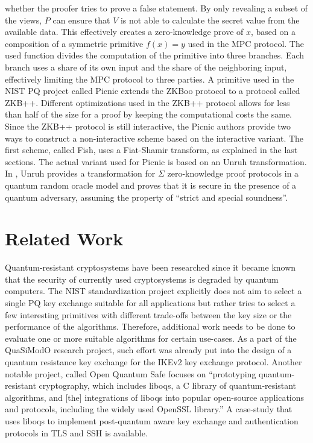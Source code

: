 whether the proofer tries to prove a false statement. By only revealing a subset of the views, \(P\) can ensure that \(V\) is not able to calculate the secret value from the available data. This effectively creates a zero-knowledge prove of \(x\), based on a composition of a symmetric primitive \(f(x) = y \) used in the \ac{MPC} protocol. The used function divides the computation of the primitive into three branches. Each branch uses a share of its own input and the share of the neighboring input, effectively limiting the \ac{MPC} protocol to three parties\cite{giacomelli2016zkboo}. A primitive used in the \ac{NIST} \ac{PQ} project called Picnic extends the ZKBoo protocol to a protocol called ZKB++. Different optimizations used in the ZKB++ protocol allows for less than half of the size for a proof by keeping the computational costs the same\cite{cryptoeprint:2017:279}. Since the ZKB++ protocol is still interactive, the Picnic authors provide two ways to construct a non-interactive scheme based on the interactive variant. The first scheme, called Fish, uses a Fiat-Shamir transform, as explained in the last sections. The actual variant used for Picnic is based on an Unruh transformation. In \cite{unruh2012quantum}, Unruh provides a transformation for \(\Sigma\) zero-knowledge proof protocols in a quantum random oracle model and proves that it is secure in the presence of a quantum adversary, assuming the property of ``strict and special soundness''.


\section{Related Work}

Quantum-resistant cryptosystems have been researched since it became known that the security of currently used cryptosystems is degraded by quantum computers. The \ac{NIST} standardization project explicitly does not aim to select a single \ac{PQ} key exchange suitable for all applications but rather tries to select a few interesting primitives with different trade-offs between the key size or the performance of the algorithms. Therefore, additional work needs to be done to evaluate one or more suitable algorithms for certain use-cases. As a part of the QuaSiModO research project, such effort was already put into the design of a quantum resistance key exchange for the IKEv2 key exchange protocol\cite{exchangetowards}. Another notable project, called Open Quantum Safe focuses on ``prototyping quantum-resistant cryptography, which includes liboqs, a C library of quantum-resistant algorithms, and [the] integrations of liboqs into popular open-source applications and protocols, including the widely used OpenSSL library.''\cite{stebila2016post} A case-study that uses liboqs to implement post-quantum aware key exchange and authentication protocols in TLS and SSH is available\cite{crockett2019prototyping}.

